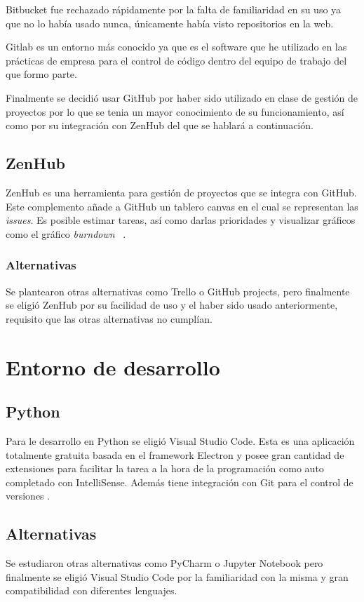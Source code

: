 Bitbucket fue rechazado rápidamente por la falta de familiaridad en su uso ya que no lo había usado nunca, únicamente había visto repositorios en la web.

Gitlab es un entorno más conocido ya que es el software que he utilizado en las prácticas de empresa para el control de código dentro del equipo de trabajo del que formo parte.

Finalmente se decidió usar GitHub por haber sido utilizado en clase de gestión de proyectos por lo que se tenia un mayor conocimiento de su funcionamiento, así como por su integración con ZenHub del que se hablará a continuación.

\subsection{ZenHub}\label{ZenHub}
ZenHub es una herramienta para gestión de proyectos que se integra con GitHub. Este complemento añade a GitHub un tablero canvas en el cual se representan las \emph{issues}. Es posible estimar tareas, así como darlas prioridades y visualizar gráficos como el gráfico \emph{burndown}~ \cite{zenhub}.

\subsubsection{Alternativas}\label{AlternativasZotero}
Se plantearon otras alternativas como Trello o GitHub projects, pero finalmente se eligió  ZenHub por su facilidad de uso y el haber sido usado anteriormente, requisito que las otras alternativas no cumplían.

\section{Entorno de desarrollo}\label{IDE}
	\subsection{Python}\label{Python}
Para le desarrollo en Python se eligió Visual Studio Code. Esta es una aplicación totalmente gratuita basada en el framework Electron y posee gran cantidad de extensiones para facilitar la tarea a la hora de la programación como auto completado con IntelliSense. Además tiene integración con Git para el control de versiones \cite{wiki:vscode_wiki,vscode}.

\subsection{Alternativas}\label{AlternativasIDE}
Se estudiaron otras alternativas como PyCharm o Jupyter Notebook pero finalmente se eligió Visual Studio Code por la familiaridad con la misma y gran compatibilidad con diferentes lenguajes.

